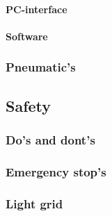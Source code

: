 \documentclass{article}
\begin{document}
        \paragraph{PC-interface}
        \paragraph{Software}
        \subsubsection{Pneumatic's}

\newpage

    \subsection{Safety}
        \subsubsection{Do's and dont's }
        \subsubsection{Emergency stop's}
        \subsubsection{Light grid}
\end{document}
